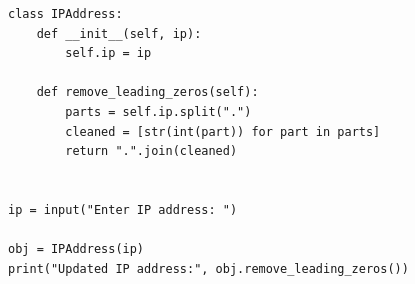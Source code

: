 \begin{verbatim}
class IPAddress:
    def __init__(self, ip):
        self.ip = ip

    def remove_leading_zeros(self):
        parts = self.ip.split(".")
        cleaned = [str(int(part)) for part in parts]
        return ".".join(cleaned)


ip = input("Enter IP address: ")

obj = IPAddress(ip)
print("Updated IP address:", obj.remove_leading_zeros())
\end{verbatim}